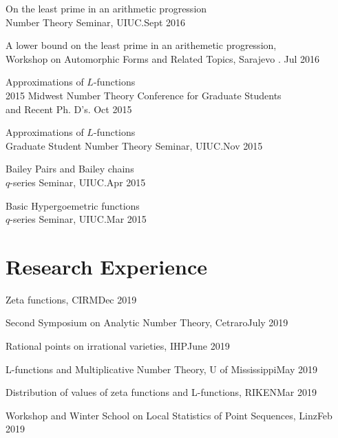 \documentclass[margin,line,pifont,palatino,courier]{res}
\newenvironment{list1}{
  \begin{list}{\ding{113}}{%
      \setlength{\itemsep}{0in}
      \setlength{\parsep}{0in} \setlength{\parskip}{0in}
      \setlength{\topsep}{0in} \setlength{\partopsep}{0in}
      \setlength{\leftmargin}{0.17in}}}{\end{list}}
\begin{document}
\begin{resume}
\begin{list1}
 \item{On the least prime in an arithmetic progression}\\ Number Theory Seminar, UIUC.{\hfill Sept 2016}

\item{A lower bound on the least prime in an arithemetic progression},\\ Workshop on Automorphic Forms and Related Topics, Sarajevo . {\hfill Jul 2016}
 
 \item{Approximations of $L$-functions} \\2015 Midwest Number Theory Conference for Graduate Students \\and Recent Ph. D's. {\hfill Oct 2015}
 
 \item{ Approximations of $L$-functions} \\	Graduate Student Number Theory Seminar, UIUC.{\hfill Nov 2015}
 
 \item{ Bailey Pairs and Bailey chains} \\	$q$-series  Seminar, UIUC.{\hfill Apr 2015}

 \item{ Basic Hypergoemetric functions} \\	$q$-series  Seminar, UIUC.{\hfill Mar 2015}
\end{list1}

\section{\sc Research Experience}
\begin{list1}
\item {Zeta functions, CIRM}{\hfill Dec 2019}

\item {Second Symposium on Analytic Number Theory, Cetraro}{\hfill July 2019}

\item {Rational points on irrational varieties, IHP}{\hfill June 2019}

\item {L-functions and Multiplicative Number Theory, U of Mississippi}{\hfill May 2019}

\item {Distribution of values of zeta functions and L-functions, RIKEN}{\hfill Mar 2019}

\item {Workshop and Winter School on Local Statistics of Point Sequences, Linz}{\hfill Feb 2019}


\end{list1}
\end{resume}
\end{document}

